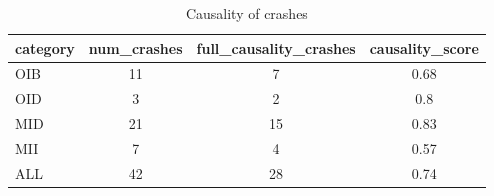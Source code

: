 \begin{table}[ht]
\centering
\renewcommand{\arraystretch}{1.06}
\setlength{\tabcolsep}{4pt}
\begin{tabular}{|l||c|c|c|}
\hline
{\sc category} & {\sc num\_crashes} & {\sc full\_causality\_crashes} & {\sc causality\_score} \\
\toprule
\hline
OIB & 11 & 7 & 0.68 \\
\hline
OID & 3 & 2 & 0.8 \\
\hline
MID & 21 & 15 & 0.83 \\
\hline
MII & 7 & 4 & 0.57 \\
\hline
ALL & 42 & 28 & 0.74 \\
\hline
\end{tabular}
\caption{Causality of crashes}
\end{table}
